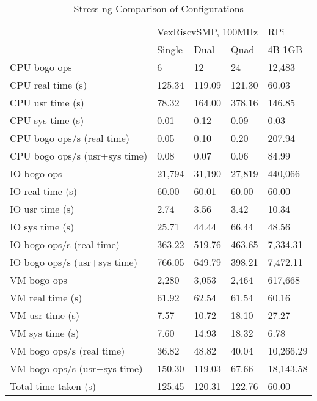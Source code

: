 \begin{table*}[ht]
    \centering
    \caption{Stress-ng Comparison of Configurations}
    \begin{tabular}{lllll}
                                  & \multicolumn{3}{l}{VexRiscvSMP, 100MHz} & RPi       \\ \cline{2-5} 
                                  & Single      & Dual        & Quad        & 4B 1GB    \\ \hline
    CPU bogo ops                  & 6           & 12          & 24          & 12,483    \\ \hline
    CPU real time (s)             & 125.34      & 119.09      & 121.30      & 60.03     \\
    CPU usr time (s)              & 78.32       & 164.00      & 378.16      & 146.85    \\
    CPU sys time (s)              & 0.01        & 0.12        & 0.09        & 0.03      \\
    CPU bogo ops/s (real time)    & 0.05        & 0.10        & 0.20        & 207.94    \\
    CPU bogo ops/s (usr+sys time) & 0.08        & 0.07        & 0.06        & 84.99     \\ \hline
    IO bogo ops                   & 21,794      & 31,190      & 27,819      & 440,066   \\ \hline
    IO real time (s)              & 60.00       & 60.01       & 60.00       & 60.00     \\
    IO usr time (s)               & 2.74        & 3.56        & 3.42        & 10.34     \\
    IO sys time (s)               & 25.71       & 44.44       & 66.44       & 48.56     \\
    IO bogo ops/s (real time)     & 363.22      & 519.76      & 463.65      & 7,334.31  \\
    IO bogo ops/s (usr+sys time)  & 766.05      & 649.79      & 398.21      & 7,472.11  \\ \hline
    VM bogo ops                   & 2,280       & 3,053       & 2,464       & 617,668   \\ \hline
    VM real time (s)              & 61.92       & 62.54       & 61.54       & 60.16     \\
    VM usr time (s)               & 7.57        & 10.72       & 18.10       & 27.27     \\
    VM sys time (s)               & 7.60        & 14.93       & 18.32       & 6.78      \\
    VM bogo ops/s (real time)     & 36.82       & 48.82       & 40.04       & 10,266.29 \\
    VM bogo ops/s (usr+sys time)  & 150.30      & 119.03      & 67.66       & 18,143.58 \\ \hline
    Total time taken (s)          & 125.45      & 120.31      & 122.76      & 60.00     \\ \hline
    \end{tabular}
    \label{table:stress1}
\end{table*}
\raggedbottom

